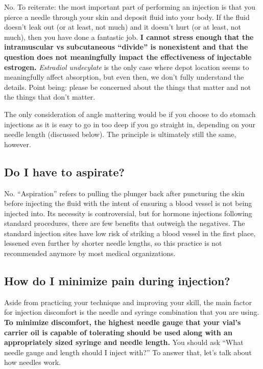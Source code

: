 \documentclass{article}
\begin{document}
No. To reiterate: the most important part of performing an injection is that you pierce a needle through your skin and deposit fluid into your body. If the fluid doesn’t leak out (or at least, not much) and it doesn’t hurt (or at least, not much), then you have done a fantastic job. \textbf{I cannot stress enough that the intramuscular vs subcutaneous “divide” is nonexistent and that the question does not meaningfully impact the effectiveness of injectable estrogen.} \textit{Estradiol undecylate} is the only case where depot location seems to meaningfully affect absorption, but even then, we don’t fully understand the details. Point being: please be concerned about the things that matter and not the things that don’t matter.

The only consideration of angle mattering would be if you choose to do stomach injections as it is easy to go in too deep if you go straight in, depending on your needle length (discussed below). The principle is ultimately still the same, however.

\subsection{Do I have to aspirate?}

No. “Aspiration” refers to pulling the plunger back after puncturing the skin before injecting the fluid with the intent of ensuring a blood vessel is not being injected into. Its necessity is controversial, but for hormone injections following standard procedures, there are few benefits that outweigh the negatives. The standard injection sites have low risk of striking a blood vessel in the first place, lessened even further by shorter needle lengths, so this practice is not recommended anymore by most medical organizations.

\subsection{How do I minimize pain during injection?}

Aside from practicing your technique and improving your skill, the main factor for injection discomfort is the needle and syringe combination that you are using. \textbf{To minimize discomfort, the highest needle gauge that your vial’s carrier oil is capable of tolerating should be used along with an appropriately sized syringe and needle length.} You should ask “What needle gauge and length should I inject with?” To answer that, let’s talk about how needles work.
\end{document}
